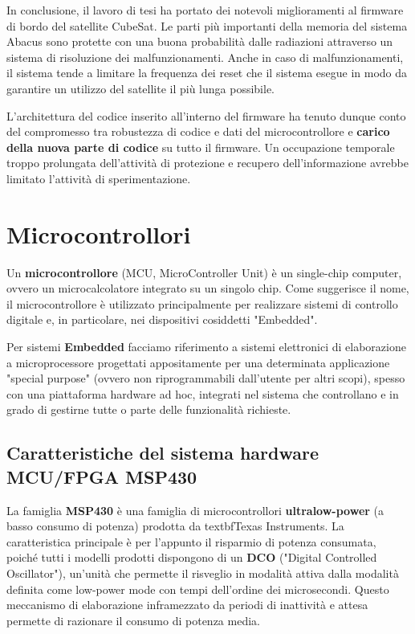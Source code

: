 \documentclass[LaM,binding=0.6cm]{../sapthesis}
\begin{document}
In conclusione, il lavoro di tesi ha portato dei notevoli miglioramenti al firmware di bordo del satellite CubeSat. Le parti più importanti della memoria del sistema Abacus sono protette con una buona probabilità dalle radiazioni attraverso un sistema di risoluzione dei malfunzionamenti. Anche in caso di malfunzionamenti, il sistema tende a limitare la frequenza dei reset che il sistema esegue in modo da garantire un utilizzo del satellite il più lunga possibile. 

L'architettura del codice inserito all'interno del firmware ha tenuto dunque conto del compromesso tra robustezza di codice e dati del microcontrollore e \textbf{carico della nuova parte di codice } su tutto il firmware. Un occupazione temporale troppo prolungata dell'attività di protezione e recupero dell'informazione avrebbe limitato l'attività di sperimentazione.



\mainmatter

\chapter{Microcontrollori}

Un \textbf{microcontrollore} (MCU, MicroController Unit) è un single-chip computer, ovvero un microcalcolatore integrato su un singolo chip. Come suggerisce il nome, il microcontrollore è utilizzato principalmente per realizzare sistemi di controllo digitale e, in particolare, nei dispositivi cosiddetti "Embedded".

Per sistemi \textbf{Embedded} facciamo riferimento a sistemi elettronici di elaborazione a microprocessore progettati appositamente per una determinata applicazione "special purpose" (ovvero non riprogrammabili dall'utente per altri scopi), spesso con una piattaforma hardware ad hoc, integrati nel sistema che controllano e in grado di gestirne tutte o parte delle funzionalità richieste.

\section{Caratteristiche del sistema hardware MCU/FPGA MSP430}

La famiglia \textbf{MSP430} è una famiglia di microcontrollori \textbf{ultralow-power} (a basso consumo di potenza) prodotta da textbf{Texas Instruments}. 
La caratteristica principale è per l'appunto il risparmio di potenza consumata, poiché tutti i modelli prodotti dispongono di un \textbf{DCO} ("Digital Controlled Oscillator"), un'unità che permette il risveglio in modalità attiva dalla modalità definita come low-power mode con tempi dell'ordine dei microsecondi. 
Questo meccanismo di elaborazione inframezzato da periodi di inattività e attesa permette di razionare il consumo di potenza media.
\end{document}
